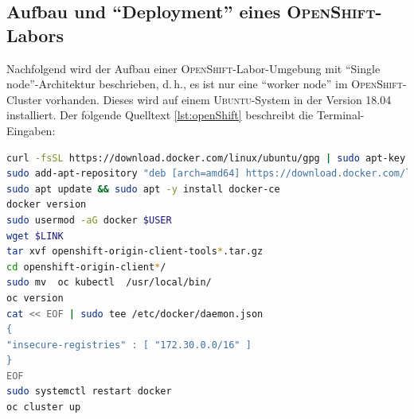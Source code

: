 \subsection{Aufbau und \enquote{Deployment} eines \textsc{OpenShift}-Labors}
Nachfolgend wird der Aufbau einer \textsc{OpenShift}-Labor-Umgebung mit \enquote{Single node}-Architektur beschrieben, d.\,h., es ist nur eine \enquote{worker node} im \textsc{OpenShift}-Cluster vorhanden. Dieses wird auf einem \textsc{Ubuntu}-System in der Version 18.04 installiert. Der folgende Quelltext \vref{lst:openShift} beschreibt die Terminal-Eingaben:

\begin{lstlisting}[language=bash, caption={Installation des \textsc{OpenShift}-Clusters}, label=lst:openShift]
curl -fsSL https://download.docker.com/linux/ubuntu/gpg | sudo apt-key add -
sudo add-apt-repository "deb [arch=amd64] https://download.docker.com/linux/ubuntu $(lsb_release -cs) stable"
sudo apt update && sudo apt -y install docker-ce
docker version
sudo usermod -aG docker $USER
wget $LINK
tar xvf openshift-origin-client-tools*.tar.gz
cd openshift-origin-client*/
sudo mv  oc kubectl  /usr/local/bin/
oc version 
cat << EOF | sudo tee /etc/docker/daemon.json 
{
"insecure-registries" : [ "172.30.0.0/16" ]
}
EOF
sudo systemctl restart docker
oc cluster up
\end{lstlisting}

